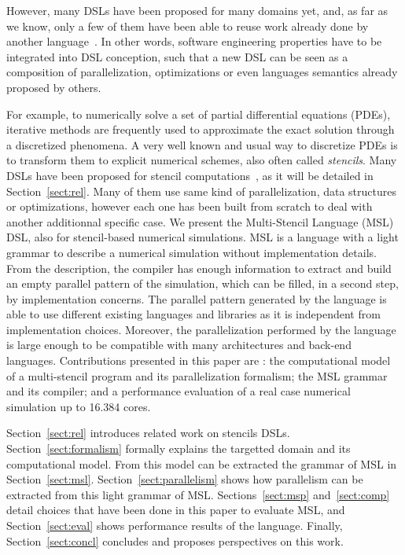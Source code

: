 However, many DSLs have been proposed for many domains yet, and, as far as we know, only a few of them have been able to reuse work already done by another language~\cite{Sujeeth:2013:CRC:2524984.2524988}. In other words, software engineering properties have to be integrated into DSL conception, such that a new DSL can be seen as a composition of parallelization, optimizations or even languages semantics already proposed by others.

For example, to numerically solve a set of partial differential equations (PDEs), iterative methods are frequently used to approximate the exact solution through a discretized phenomena. A very well known and usual way to discretize PDEs is to transform them to explicit numerical schemes, also often called \emph{stencils}. Many DSLs have been proposed for stencil computations~\cite{spaaTangCKLL11,citeulike12258902,Ragan-Kelley:2013:HLC:2491956.2462176,DeVito:2011:LDS:2063384.2063396,Camier:2015:IPP:2820083.2820107}, as it will be detailed in Section~\ref{sect:rel}. Many of them use same kind of parallelization, data structures or optimizations, however each one has been built from scratch to deal with another additionnal specific case.
We present the Multi-Stencil Language (MSL) DSL, also for stencil-based numerical simulations. MSL is a language with a light grammar to describe a numerical simulation without implementation details. From the description, the compiler has enough information to extract and build an empty parallel pattern of the simulation, which can be filled, in a second step, by implementation concerns. The parallel pattern generated by the language is able to use different existing languages and libraries as it is independent from implementation choices. Moreover, the parallelization performed by the language is large enough to be compatible with many architectures and back-end languages. Contributions presented in this paper are : the computational model of a multi-stencil program and its parallelization formalism; the MSL grammar and its compiler; and a performance evaluation of a real case numerical simulation up to 16.384 cores.

Section~\ref{sect:rel} introduces related work on stencils DSLs. Section~\ref{sect:formalism} formally explains the targetted domain and its computational model. From this model can be extracted the grammar of MSL in Section~\ref{sect:msl}. Section~\ref{sect:parallelism} shows how parallelism can be extracted from this light grammar of MSL. Sections~\ref{sect:msp} and~\ref{sect:comp} detail choices that have been done in this paper to evaluate MSL, and Section~\ref{sect:eval} shows performance results of the language. Finally, Section~\ref{sect:concl} concludes and proposes perspectives on this work.